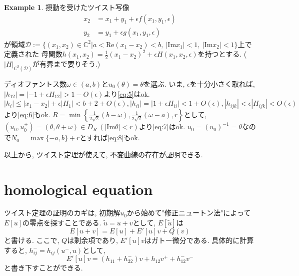 \documentclass[a4paper]{ujarticle}
\numberwithin{equation}{section}
\theoremstyle{definition}
\newtheorem{example}{Example}
\begin{document}
        \begin{example}
            摂動を受けたツイスト写像
            \begin{align}
                x_2 &= x_1 + y_1 + \epsilon f(x_1, y_1, \epsilon) \\
                y_2 &= y_1 + \epsilon g(x_1, y_1, \epsilon)
            \end{align}
            が領域$\mathcal{D} := \{(x_1, x_2) \in \mathbb{C}^2 | a < \mathrm{Re}(x_1 - x_2) < b, \ |\mathrm{Im} x_1| < 1, \ |\mathrm{Im} x_2| < 1\}$上で定義された
            母関数$h(x_1, x_2) = \frac{1}{2}(x_1 - x_2)^2 + \epsilon H(x_1, x_2, \epsilon)$を持つとする. ($|H|_{C^3(\mathcal{D})}$が有界まで要りそう.)

            ディオファントス数$\omega \in (a, b)$と$u_0(\theta) = \theta$を選ぶ.
            いま, $\epsilon$を十分小さく取れば, 
            $|h_{12}| = |- 1 + \epsilon H_{12}| > 1 - O(\epsilon)$より\eqref{eq:5}はok.
            $|h_{i}| \leq |x_1 - x_2| + \epsilon |H_{1}| < b + 2 + O(\epsilon), |h_{ii}| = |1 + \epsilon H_{ii}|  < 1 + O(\epsilon), |h_{ijk}| < \epsilon|H_{ijk}| < O(\epsilon)$
            より\eqref{eq:6}もok. 
            $\displaystyle R =  \min\left\{\frac{1}{2\sqrt{2}}(b - \omega), \frac{1}{2\sqrt{2}}(\omega - a), r\right\}$として, 
            $(u_0, u^{+}_0) = (\theta, \theta + \omega) \in D_{R} \ (|\mathrm{Im} \theta| < r)$より\eqref{eq:7}はok.
            $u_0 = (u_0)^{-1} = \theta$なので$N_0 = \max\{-a, b\} + r$とすれば\eqref{eq:8}もok.

            以上から, ツイスト定理が使えて, 不変曲線の存在が証明できる.
        \end{example}

        \section{homological equation}
        ツイスト定理の証明のカギは, 初期解$u_0$から始めて"修正ニュートン法"によって$E[u]$の零点を探すことである.
        $\tilde{u} = u + v$として, $E[\tilde{u}]$は
        \[
            E[u + v] = E[u] + E'[u] v + Q(v)
        \]
        と書ける. ここで, $Q$は剰余項であり, $E'[u]v$はガトー微分である.
        具体的に計算すると, $h_{ij}^{-} = h_{ij}(u^{-}, u)$として, 
        \begin{equation} \label{eq:11}
            E'[u] v = (h_{11} + h_{22}^{-})v + h_{12} v^{+} + h_{12}^{-} v^{-}
        \end{equation}
        と書き下すことができる.
\end{document}
